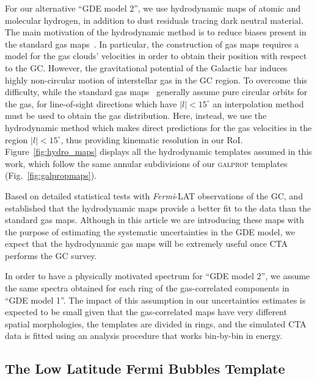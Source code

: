\documentclass[doublespace,nopageskip]{VTthesis} %
\begin{document}
For our alternative ``GDE model 2'', we use hydrodynamic maps of atomic and molecular hydrogen, in addition to dust residuals tracing dark neutral material. The main motivation of the hydrodynamic method is to reduce biases present in the standard gas maps~\citep{Ackermann:2012}. In particular, the construction of gas maps requires a model for the gas clouds' velocities in order to obtain their position with respect to the GC. 
However, the gravitational potential of the Galactic bar induces highly non-circular motion of interstellar gas in the GC region. 
%
To overcome this difficulty, while the standard gas maps~\citep{Ackermann:2012} generally assume pure circular orbits for the gas, for line-of-sight directions which have $\lvert l \rvert < 15^\circ $ an interpolation method must be used to obtain the gas distribution. 
%
Here, instead, we use the hydrodynamic method \citep{Pohl2008,Macias:2016nev} which makes direct predictions for the gas velocities in the region $\lvert l \rvert < 15^\circ $, thus providing kinematic resolution in our RoI. Figure~\ref{fig:hydro_maps} displays all the hydrodynamic templates assumed in this work, which follow the same annular subdivisions of our \textsc{galprop} templates (Fig.~\ref{fig:galpropmaps}).

Based on detailed statistical tests with \textit{Fermi}-LAT observations of the GC, \cite{Macias:2016nev,Macias:2019omb} and \cite{Buschmann:2020adf} established that the hydrodynamic maps provide a better fit to the data than the standard gas maps. Although in this article we are introducing these  maps with the purpose of estimating the systematic uncertainties in the GDE model, we expect that the hydrodynamic gas maps will be extremely useful once CTA~\citep{Acharyya:2020sbj} performs the GC survey.  

In order to have a physically motivated spectrum for ``GDE model 2'', we assume the same spectra obtained for each ring of the gas-correlated components in ``GDE model 1''. The impact of this assumption in our uncertainties estimates is expected to be small given that the gas-correlated maps have very different spatial morphologies, the templates are divided in rings, and the simulated CTA data is fitted using an analysis procedure that works bin-by-bin in energy. 


\subsection{The Low Latitude Fermi Bubbles Template}
\label{subsec:FBs}
\end{document}
